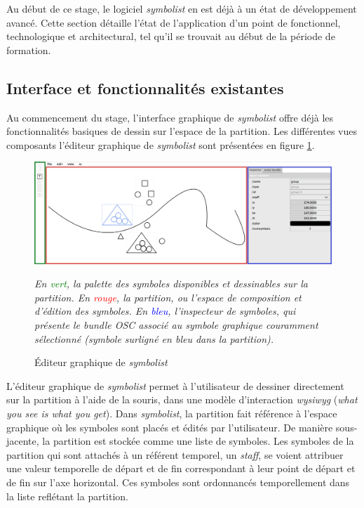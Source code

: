 Au début de ce stage, le logiciel \textit{symbolist} en est déjà à un état de développement avancé. Cette section détaille l'état de l'application d'un point de fonctionnel, technologique et architectural, tel qu'il se trouvait au début de la période de formation.

\subsection{Interface et fonctionnalités existantes}
\label{subsec:uiAndExistingFeatures}

Au commencement du stage, l'interface graphique de \textit{symbolist} offre déjà les fonctionnalités basiques de dessin sur l'espace de la partition. Les différentes vues composants l'éditeur graphique de \textit{symbolist} sont présentées en figure \ref{fig:symbolistUIBefore}.

\begin{figure}[H]
	\centering
	\includegraphics[keepaspectratio=true, width=\textwidth]{PresentationDeSymbolist/i/symbolistUIBefore.png}
	\caption{Éditeur graphique de \textit{symbolist}}
	\label{fig:symbolistUIBefore}
	\small
	\it
	En \textcolor{green}{vert}, la palette des symboles disponibles et dessinables sur la partition. En \textcolor{red}{rouge}, la partition, ou l'espace de composition et d'édition des symboles. En \textcolor{blue}{bleu}, l'inspecteur de symboles, qui présente le bundle OSC associé au symbole graphique couramment sélectionné (symbole surligné en bleu dans la partition).
\end{figure}

L'éditeur graphique de \textit{symbolist} permet à l'utilisateur de dessiner directement sur la partition à l'aide de la souris, dans une modèle d'interaction \textit{wysiwyg} (\textit{what you see is what you get}). Dans \textit{symbolist}, la partition fait référence à l'espace graphique où les symboles sont placés et édités par l'utilisateur. De manière sous-jacente, la partition est stockée comme une liste de symboles. Les symboles de la partition qui sont attachés à un référent temporel, un \textit{staff}, se voient attribuer une valeur temporelle de départ et de fin correspondant à leur point de départ et de fin sur l'axe horizontal. Ces symboles sont ordonnancés temporellement dans la liste reflétant la partition.

